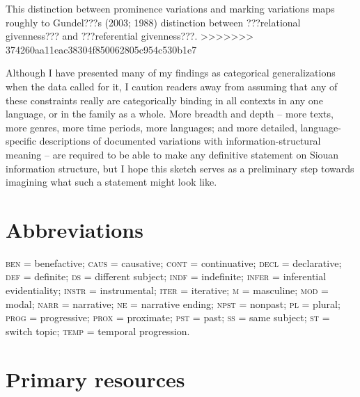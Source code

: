 \documentclass[output=paper]{LSP/langsci}
\begin{document}
This distinction between prominence variations and marking variations maps roughly to Gundel???s (2003; 1988) distinction between ???relational givenness??? and  ???referential givenness???.
>>>>>>> 374260aa11eac38304f850062805c954c530b1e7

Although I have presented many of my findings as categorical generalizations when the data called for it, I caution readers away from assuming that any of these constraints really are categorically binding in all contexts in any one language, or in the family as a whole. More breadth and depth -- more texts, more genres, more time periods, more languages; and more detailed, language-specific descriptions of documented variations with information-structural meaning -- are required to be able to make any definitive statement on Siouan information structure, but I hope this sketch serves as a preliminary step towards imagining what such a statement might look like.

\section* {Abbreviations}

\textsc{ben} = benefactive; \textsc{caus} = causative; \textsc{cont} = continuative; \textsc{decl} = declarative; \textsc{def} = definite; \textsc{ds} =  different subject; \textsc{indf} = indefinite; \textsc{infer} = inferential evidentiality; \textsc{instr} = instrumental; \textsc{iter} = iterative; \textsc{m} =  masculine; \textsc{mod} = modal; \textsc{narr} = narrative; \textsc{ne} = narrative ending; \textsc{npst} = nonpast; \textsc{pl} = plural; \textsc{prog} =  progressive; \textsc{prox} = proximate; \textsc{pst} = past; \textsc{ss} = same subject; \textsc{st} = switch topic; \textsc{temp} = temporal progression.

\section*{Primary resources}
\end{document}

